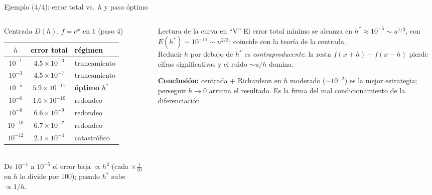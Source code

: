 \documentclass[aspectratio=169,10pt]{beamer}
\begin{document}
\begin{frame}{Ejemplo (4/4): error total vs.\ $h$ y paso óptimo}
\begin{columns}[T]
\begin{column}{0.52\textwidth}
\begin{cardgear}{Centrada $D(h)$, $f=e^x$ en $1$ (paso 4)}{\faTable}
\centering
{\footnotesize\renewcommand{\arraystretch}{1.3}\setlength{\tabcolsep}{6pt}
\begin{tabular}{c|c|l}
$h$ & error total & régimen\\\hline
$10^{-1}$ & $4.5{\times}10^{-3}$ & truncamiento\\
$10^{-3}$ & $4.5{\times}10^{-7}$ & truncamiento\\
$10^{-5}$ & $5.9{\times}10^{-11}$ & \textbf{óptimo} $h^*$\\
$10^{-6}$ & $1.6{\times}10^{-10}$ & redondeo\\
$10^{-8}$ & $6.6{\times}10^{-9}$ & redondeo\\
$10^{-10}$ & $6.7{\times}10^{-7}$ & redondeo\\
$10^{-12}$ & $2.1{\times}10^{-4}$ & catastrófico\\
\end{tabular}}\\[1.0mm]
{\footnotesize De $10^{-1}$ a $10^{-5}$ el error baja $\propto h^2$ (cada $\times\tfrac1{10}$ en $h$ lo divide por $100$); pasado $h^*$ sube $\propto 1/h$.}
\end{cardgear}
\end{column}
\begin{column}{0.46\textwidth}
\begin{cardidea}{Lectura de la curva en ``V''}{\faSuperscript}
{\footnotesize El error total mínimo se alcanza en $h^*\approx10^{-5}\sim u^{1/3}$, con $E(h^*)\sim10^{-11}\sim u^{2/3}$: coincide con la teoría de la centrada.\\[0.8mm]
Reducir $h$ por debajo de $h^*$ es \emph{contraproducente}: la resta $f(x{+}h)-f(x{-}h)$ pierde cifras significativas y el ruido $\sim u/h$ domina.}
\end{cardidea}
\vspace{1mm}
\begin{cardnota}[\faInfoCircle]
{\footnotesize \textbf{Conclusión:} centrada + Richardson en $h$ moderado ($\sim10^{-2}$) es la mejor estrategia; perseguir $h\to0$ arruina el resultado. Es la firma del mal condicionamiento de la diferenciación.}
\end{cardnota}
\end{column}
\end{columns}
\end{frame}
\end{document}
